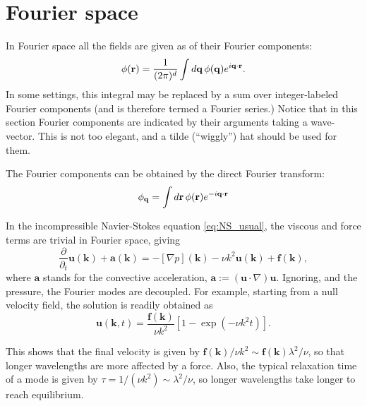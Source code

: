 \section{Fourier space}

In Fourier space all the fields are given as  of their Fourier components:
\begin{equation}
	\label{eq:F_q_to_r}
	\phi(\mathbf{r}) = \frac 1{(2\pi)^d}  \int d\mathbf{q} \, \phi(\mathbf{q}) e^{ i\mathbf{q}\cdot\mathbf{r}} .
\end{equation}
In some settings, this integral may be replaced by a sum over integer-labeled Fourier components
(and is therefore termed a Fourier series.)
Notice that in this section Fourier components are indicated by their arguments taking a wave-vector. This is not too elegant, and a tilde (``wiggly'')
hat should be used for them.

The Fourier components can be obtained by the direct Fourier transform:
\begin{equation}
	\label{eq:F_r_to_q}
	\phi_{\mathbf{q}} =                    \int d\mathbf{r} \, \phi(\mathbf{r}) e^{-i\mathbf{q}\cdot\mathbf{r}}  
\end{equation}

In the incompressible Navier-Stokes equation \eqref{eq:NS_usual}, the viscous and force terms are trivial in Fourier space, giving
\begin{equation*}
	\frac{\partial}{\partial_t} \mathbf{u} (\mathbf{k}) + \mathbf{a}(\mathbf{k}) =
	-[\nabla p ](\mathbf{k}) - \nu k^2 \mathbf{u}(\mathbf{k}) + \mathbf{f}(\mathbf{k}) ,
\end{equation*}
where $\mathbf{a}$ stands for the convective acceleration, $ \mathbf{a} := (\mathbf{u}\cdot\nabla)\mathbf{u} $. Ignoring, and the pressure, the Fourier modes are decoupled. For example, starting from a null velocity field, the solution is
readily obtained as
\begin{equation} \label{eq:Fourier_simple_solution}
	\mathbf{u} (\mathbf{k}, t ) =
	\frac{\mathbf{f}(\mathbf{k})}{\nu k^2}
	\left[ 1-  \exp \left( - \nu k^2 t  \right)   \right]  .
\end{equation}

This shows that the final velocity is given by $\mathbf{f}(\mathbf{k}) / \nu k^2 \sim  \mathbf{f}(\mathbf{k}) \lambda^2 / \nu $, so that longer wavelengths are more affected by a force.
Also, the typical relaxation time of a mode is given by $\tau= 1/( \nu k^2 ) \sim \lambda^2 / \nu$, so longer wavelengths take longer to reach equilibrium.




